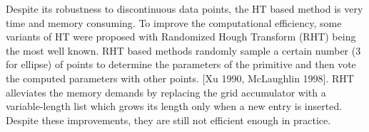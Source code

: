 \documentclass[a4paper]{report}
\begin{document}
Despite its robustness to discontinuous data points, the HT based method is very time and memory consuming. 
To improve the computational efficiency, some variants of HT were proposed with Randomized Hough Transform (RHT) being the most well known. RHT based methods randomly sample a certain number (3 for ellipse) of points to determine the parameters of the primitive and then vote the computed parameters with other points. 
[Xu 1990, McLaughlin 1998].
RHT alleviates the memory demands by replacing the grid accumulator with a variable-length list which grows its length only when a new entry is inserted.
Despite these improvements, they are still not efficient enough in practice. 



\end{document}
